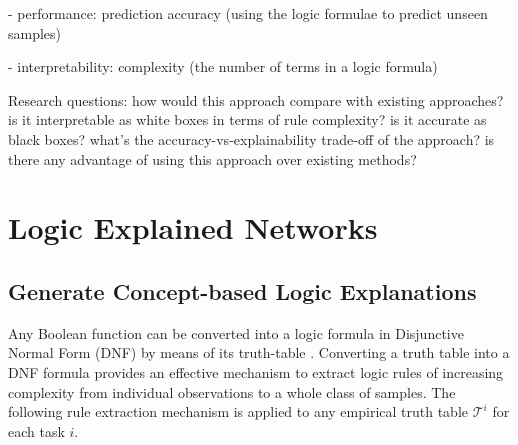 \documentclass[withindex,glossary]{cam-thesis}
\theoremstyle{plain}
\theoremstyle{definition}
\theoremstyle{remark}
\begin{document}
- performance: prediction accuracy (using the logic formulae to predict unseen samples)

- interpretability: complexity (the number of terms in a logic formula)

Research questions: how would this approach compare with existing approaches? is it interpretable as white boxes in terms of rule complexity? is it accurate as black boxes? what's the accuracy-vs-explainability trade-off of the approach? is there any advantage of using this approach over existing methods?


\section{Logic Explained Networks}

\subsection{Generate Concept-based Logic Explanations}
Any Boolean function can be converted into a logic formula in Disjunctive Normal Form (DNF) by means of its truth-table \citep{mendelson2009introduction}. 
Converting a truth table into a DNF formula provides an effective mechanism to extract logic rules of increasing complexity from individual observations
to a whole class of samples. 
The following rule extraction mechanism is applied to any empirical truth table $\mathcal{T}^i$ for each task $i$.
\end{document}

